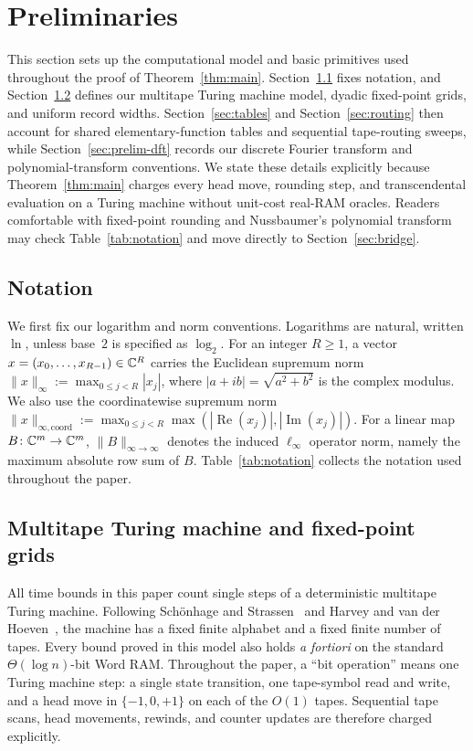 \section{Preliminaries}\label{sec:prelim}

This section sets up the computational model and basic primitives used throughout the proof of Theorem~\ref{thm:main}. Section~\ref{sec:notation} fixes notation, and Section~\ref{sec:prelim-model} defines our multitape Turing machine model, dyadic fixed-point grids, and uniform record widths. Section~\ref{sec:tables} and Section~\ref{sec:routing} then account for shared elementary-function tables and sequential tape-routing sweeps, while Section~\ref{sec:prelim-dft} records our discrete Fourier transform and polynomial-transform conventions. We state these details explicitly because Theorem~\ref{thm:main} charges every head move, rounding step, and transcendental evaluation on a Turing machine without unit-cost real-RAM oracles. Readers comfortable with fixed-point rounding and Nussbaumer's polynomial transform may check Table~\ref{tab:notation} and move directly to Section~\ref{sec:bridge}.

\subsection{Notation}\label{sec:notation}

We first fix our logarithm and norm conventions. Logarithms are natural, written $\ln$, unless base~$2$ is specified as $\log_2$. For an integer $R \ge 1$, a vector $x = (x_0, \dots, x_{R-1}) \in \mathbb{C}^R$ carries the Euclidean supremum norm $\|x\|_\infty := \max_{0 \le j < R} |x_j|$, where $|a + i b| = \sqrt{a^2 + b^2}$ is the complex modulus. We also use the coordinatewise supremum norm $\|x\|_{\infty,\mathrm{coord}} := \max_{0 \le j < R} \max(|\operatorname{Re}(x_j)|, |\operatorname{Im}(x_j)|)$. For a linear map $B\colon \mathbb{C}^m \to \mathbb{C}^m$, $\|B\|_{\infty \to \infty}$ denotes the induced $\ell_\infty$ operator norm, namely the maximum absolute row sum of $B$. Table~\ref{tab:notation} collects the notation used throughout the paper.

\subsection{Multitape Turing machine and fixed-point grids}\label{sec:prelim-model}

All time bounds in this paper count single steps of a deterministic multitape Turing machine. Following Sch\"onhage and Strassen~\cite{SS71} and Harvey and van der Hoeven~\cite[Section~2.1]{HvdH21}, the machine has a fixed finite alphabet and a fixed finite number of tapes. Every bound proved in this model also holds \emph{a fortiori} on the standard $\Theta(\log n)$-bit Word RAM. Throughout the paper, a ``bit operation'' means one Turing machine step: a single state transition, one tape-symbol read and write, and a head move in $\{-1, 0, +1\}$ on each of the $O(1)$ tapes. Sequential tape scans, head movements, rewinds, and counter updates are therefore charged explicitly.

